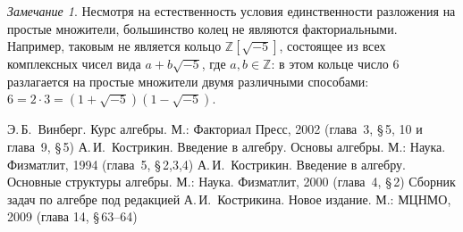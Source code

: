 \documentclass[a4paper,10pt]{amsart}
\def\ZZ{{\mathbb Z}}%
\theoremstyle{definition}
\theoremstyle{remark}
\newtheorem{remark}{Замечание}
\begin{document}
\begin{remark}
Несмотря на естественность условия единственности разложения на
простые множители, большинство колец не являются факториальными.
Например, таковым не является кольцо $\ZZ[\sqrt{-5}]$, состоящее из
всех комплексных чисел вида $a + b \sqrt{-5}$, где $a,b \in \ZZ$: в
этом кольце число $6$ разлагается на простые множители двумя
различными способами: $6 = 2 \cdot 3 = (1 + \sqrt{-5})(1 -
\sqrt{-5})$.
\end{remark}

\bigskip

\begin{thebibliography}{99}
Э.\,Б.~Винберг. Курс алгебры. М.: Факториал Пресс, 2002 (глава~3,
\S\,5, 10 и глава~9, \S\,5)
А.\,И.~Кострикин. Введение в алгебру. Основы алгебры. М.: Наука.
Физматлит, 1994 (глава~5, \S\,2,3,4)
А.\,И.~Кострикин. Введение в алгебру. Основные структуры алгебры.
М.: Наука. Физматлит, 2000 (глава~4, \S\,2)
Сборник задач по алгебре под редакцией А.\,И.~Кострикина. Новое
издание. М.: МЦНМО, 2009 (глава 14, \S\,63--64)
\end{thebibliography}
\end{document}
